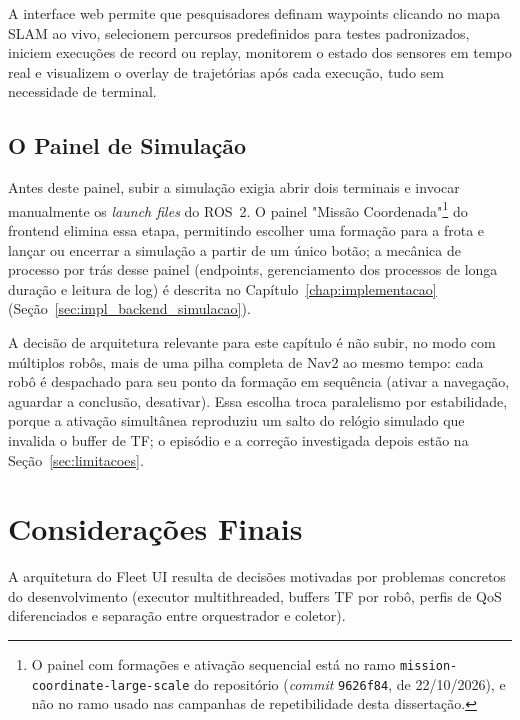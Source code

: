 A interface web permite que pesquisadores definam waypoints clicando no mapa SLAM
ao vivo, selecionem percursos predefinidos para testes padronizados, iniciem
execuções de record ou replay, monitorem o estado dos sensores em tempo real e
visualizem o overlay de trajetórias após cada execução, tudo sem necessidade
de terminal.

\subsection{O Painel de Simulação}
\label{sec:painel_simulacao}

Antes deste painel, subir a simulação exigia abrir dois terminais e invocar
manualmente os \textit{launch files} do ROS~2. O painel "Missão
Coordenada"\footnote{O painel com formações e ativação sequencial está no
ramo \texttt{mission-\allowbreak coordinate-\allowbreak large-\allowbreak scale}
do repositório (\textit{commit} \texttt{9626f84}, de 22/10/2026), e não no
ramo usado nas campanhas de repetibilidade desta dissertação.} do frontend
elimina essa etapa, permitindo escolher uma
formação para a frota e lançar ou encerrar a simulação a partir de um
único botão; a mecânica de processo por trás desse painel (endpoints,
gerenciamento dos processos de longa duração e leitura de log) é
descrita no Capítulo~\ref{chap:implementacao}
(Seção~\ref{sec:impl_backend_simulacao}).

A decisão de arquitetura relevante para este capítulo é não subir, no modo
com múltiplos robôs, mais de uma pilha completa de Nav2 ao mesmo tempo: cada
robô é despachado para seu ponto da formação em sequência (ativar a navegação,
aguardar a conclusão, desativar). Essa escolha troca paralelismo por
estabilidade, porque a ativação simultânea reproduziu um salto do relógio
simulado que invalida o buffer de TF; o episódio e a correção investigada
depois estão na Seção~\ref{sec:limitacoes}.

\section{Considerações Finais}
\label{sec:arq_conclusao}

A arquitetura do Fleet UI resulta de decisões motivadas por problemas concretos
do desenvolvimento (executor multithreaded, buffers TF por robô, perfis de QoS
diferenciados e separação entre orquestrador e coletor).

